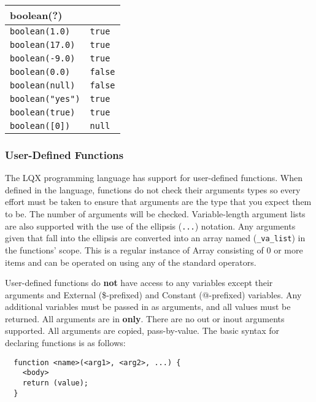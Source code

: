 \begin{multicols}{2}
  \begin{center}
    \begin{tabular}{|p{1.5in}|p{1.2in}|}
      \hline
      \multicolumn{2}{|l|}{\textbf{boolean(?)}}\\
      \hline
      {\tt boolean(1.0)} & {\tt true}\\
      {\tt boolean(17.0)} & {\tt true}\\
      {\tt boolean(-9.0)} & {\tt true}\\
      {\tt boolean(0.0)} & {\tt false}\\
      {\tt boolean(null)}& {\tt false}\\
      {\tt boolean("yes")}&{\tt true}\\
      {\tt boolean(true)}& {\tt true}\\
      {\tt boolean([0])} & {\tt null}\\
      \hline
    \end{tabular}
  \end{center}
\end{multicols}

\subsubsection{User-Defined Functions}

The LQX programming language has support for user-defined functions. When
defined in the language, functions do not check their arguments types so every
effort must be taken to ensure that arguments are the type that you expect them
to be. The number of arguments will be checked. Variable-length 
argument lists are also supported with the use of the
ellipsis ({\tt ...}) notation. Any arguments given that fall into the ellipsis
are converted into an array named ({\tt \_va\_list}) in the functions' scope.
This is a regular instance of Array consisting of 0 or more items and can be
operated on using any of the standard operators.

User-defined functions do \textbf{not} have access to any variables except
their arguments and External (\$-prefixed) and Constant (@-prefixed) variables.
Any additional variables must be passed in as arguments, and all values must
be returned. All arguments are in \textbf{only}. There are no out or inout
arguments supported. All arguments are copied, pass-by-value. The basic syntax 
for declaring functions is as follows:

\lstset{language=C++}
\begin{lstlisting}  
  function <name>(<arg1>, <arg2>, ...) {
    <body>
    return (value);
  }
\end{lstlisting}

